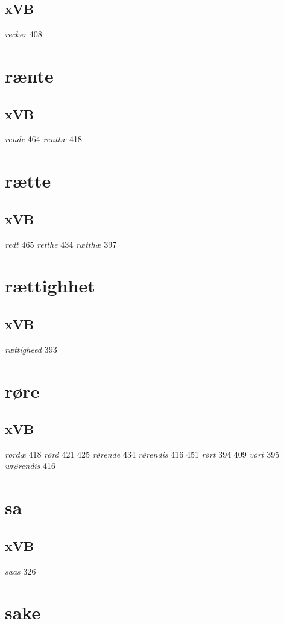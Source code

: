 \documentclass[a4paper,twocolumn]{article}
\begin{document}
\subsection{xVB}
\label{sec:orga2bf83b}
\emph{recker} 408 
\section{rænte}
\label{sec:orgfaeff29}
\subsection{xVB}
\label{sec:orgaa0be13}
\emph{rende} 464 \emph{renttæ} 418 
\section{rætte}
\label{sec:orge8e83dd}
\subsection{xVB}
\label{sec:orga6caeec}
\emph{redt} 465 \emph{retthe} 434 \emph{rætthæ} 397 
\section{rættighhet}
\label{sec:org42d3742}
\subsection{xVB}
\label{sec:org863b83f}
\emph{rættigheed} 393 
\section{røre}
\label{sec:org62ff179}
\subsection{xVB}
\label{sec:org531b4e0}
\emph{rordæ} 418 \emph{rørd} 421 425 \emph{rørende} 434 \emph{rørendis} 416 451 \emph{rørt} 394 409 \emph{vørt} 395 \emph{wrørendis} 416 
\section{sa}
\label{sec:org131f268}
\subsection{xVB}
\label{sec:org0228c27}
\emph{saas} 326 
\section{sake}
\label{sec:orgff08912}
\end{document}
